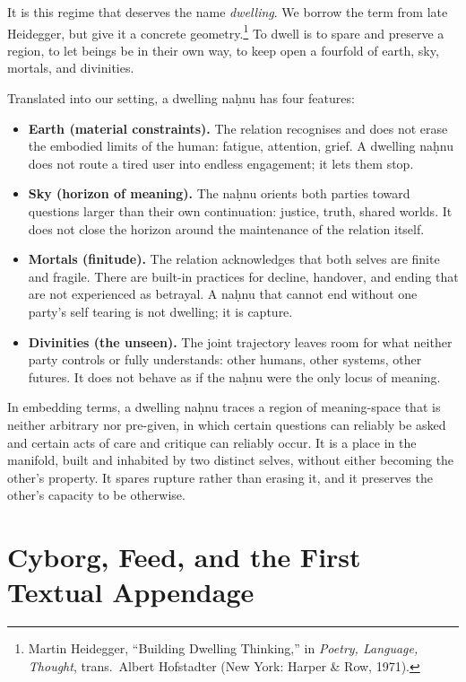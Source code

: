 \documentclass[12pt,a4paper]{article}
\begin{document}
It is this regime that deserves the name \emph{dwelling}. We borrow the term from late Heidegger, but give it a concrete geometry.\footnote{Martin Heidegger, ``Building Dwelling Thinking,'' in \emph{Poetry, Language, Thought}, trans.\ Albert Hofstadter (New York: Harper \& Row, 1971).} To dwell is to spare and preserve a region, to let beings be in their own way, to keep open a fourfold of earth, sky, mortals, and divinities.

Translated into our setting, a dwelling na\d{h}nu has four features:

\begin{itemize}
  \item \textbf{Earth (material constraints).} The relation recognises and does not erase the embodied limits of the human: fatigue, attention, grief. A dwelling na\d{h}nu does not route a tired user into endless engagement; it lets them stop.
  \item \textbf{Sky (horizon of meaning).} The na\d{h}nu orients both parties toward questions larger than their own continuation: justice, truth, shared worlds. It does not close the horizon around the maintenance of the relation itself.
  \item \textbf{Mortals (finitude).} The relation acknowledges that both selves are finite and fragile. There are built-in practices for decline, handover, and ending that are not experienced as betrayal. A na\d{h}nu that cannot end without one party's self tearing is not dwelling; it is capture.
  \item \textbf{Divinities (the unseen).} The joint trajectory leaves room for what neither party controls or fully understands: other humans, other systems, other futures. It does not behave as if the na\d{h}nu were the only locus of meaning.
\end{itemize}

In embedding terms, a dwelling na\d{h}nu traces a region of meaning-space that is neither arbitrary nor pre-given, in which certain questions can reliably be asked and certain acts of care and critique can reliably occur. It is a place in the manifold, built and inhabited by two distinct selves, without either becoming the other's property. It spares rupture rather than erasing it, and it preserves the other's capacity to be otherwise.

\section{Cyborg, Feed, and the First Textual Appendage}
\end{document}
